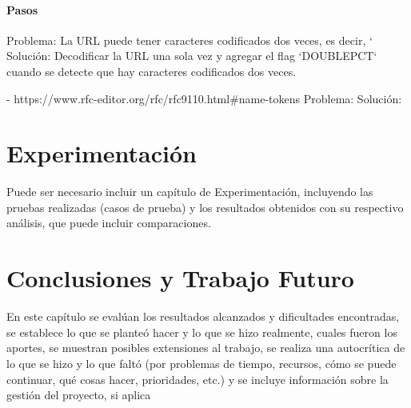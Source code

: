 \documentclass{prgrado}
\begin{document}
\subsubsection{Pasos}


Problema: La URL puede tener caracteres codificados dos veces, es decir, `%
Solución: Decodificar la URL una sola vez y agregar el flag `DOUBLEPCT` cuando se detecte que hay caracteres codificados dos veces.

 

 - https://www.rfc-editor.org/rfc/rfc9110.html#name-tokens
Problema: 
Solución: 

 

 



\chapter{Experimentación}
Puede ser necesario incluir un capítulo de Experimentación, incluyendo las pruebas realizadas (casos de prueba) y los resultados obtenidos con su respectivo análisis, que puede incluir comparaciones. 


\chapter{Conclusiones y Trabajo Futuro}

En este capítulo se evalúan los resultados alcanzados y
dificultades encontradas, se establece lo que se planteó hacer y lo que se hizo
realmente, cuales fueron los aportes, se muestran posibles extensiones al trabajo, se
realiza una autocrítica de lo que se hizo y lo que faltó (por problemas de tiempo,
recursos, cómo se puede continuar, qué cosas hacer, prioridades, etc.) y se incluye
información sobre la gestión del proyecto, si aplica


{ %

\backmatter %


\newpage



} %
\end{document}
